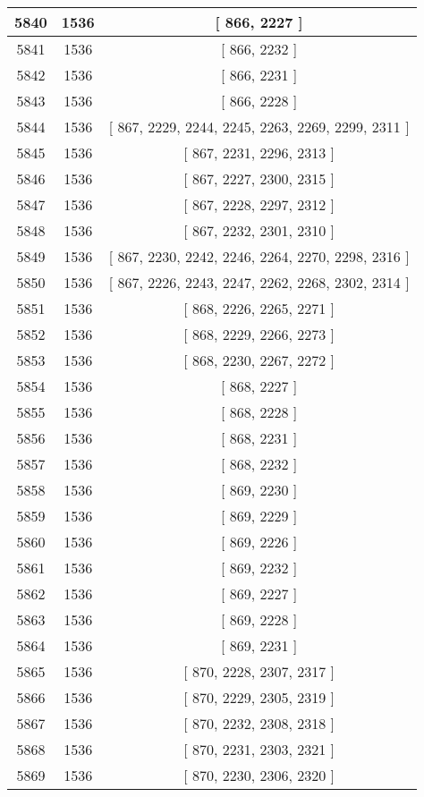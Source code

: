 \begin{center}
\begin{longtable}[H]{|| c c c ||}
\hline
5840 & 1536 & [ 866, 2227 ] \\ 
\hline
5841 & 1536 & [ 866, 2232 ] \\ 
\hline
5842 & 1536 & [ 866, 2231 ] \\ 
\hline
5843 & 1536 & [ 866, 2228 ] \\ 
\hline
5844 & 1536 & [ 867, 2229, 2244, 2245, 2263, 2269, 2299, 2311 ] \\ 
\hline
5845 & 1536 & [ 867, 2231, 2296, 2313 ] \\ 
\hline
5846 & 1536 & [ 867, 2227, 2300, 2315 ] \\ 
\hline
5847 & 1536 & [ 867, 2228, 2297, 2312 ] \\ 
\hline
5848 & 1536 & [ 867, 2232, 2301, 2310 ] \\ 
\hline
5849 & 1536 & [ 867, 2230, 2242, 2246, 2264, 2270, 2298, 2316 ] \\ 
\hline
5850 & 1536 & [ 867, 2226, 2243, 2247, 2262, 2268, 2302, 2314 ] \\ 
\hline
5851 & 1536 & [ 868, 2226, 2265, 2271 ] \\ 
\hline
5852 & 1536 & [ 868, 2229, 2266, 2273 ] \\ 
\hline
5853 & 1536 & [ 868, 2230, 2267, 2272 ] \\ 
\hline
5854 & 1536 & [ 868, 2227 ] \\ 
\hline
5855 & 1536 & [ 868, 2228 ] \\ 
\hline
5856 & 1536 & [ 868, 2231 ] \\ 
\hline
5857 & 1536 & [ 868, 2232 ] \\ 
\hline
5858 & 1536 & [ 869, 2230 ] \\ 
\hline
5859 & 1536 & [ 869, 2229 ] \\ 
\hline
5860 & 1536 & [ 869, 2226 ] \\ 
\hline
5861 & 1536 & [ 869, 2232 ] \\ 
\hline
5862 & 1536 & [ 869, 2227 ] \\ 
\hline
5863 & 1536 & [ 869, 2228 ] \\ 
\hline
5864 & 1536 & [ 869, 2231 ] \\ 
\hline
5865 & 1536 & [ 870, 2228, 2307, 2317 ] \\ 
\hline
5866 & 1536 & [ 870, 2229, 2305, 2319 ] \\ 
\hline
5867 & 1536 & [ 870, 2232, 2308, 2318 ] \\ 
\hline
5868 & 1536 & [ 870, 2231, 2303, 2321 ] \\ 
\hline
5869 & 1536 & [ 870, 2230, 2306, 2320 ] \\ 

\end{longtable}
\end{center}
